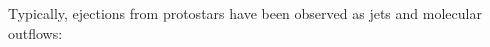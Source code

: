 \documentclass[12pt]{mythesis}
\begin{document}
% 
% 

Typically, ejections from protostars have been observed as jets and molecular outflows:
\end{document}

